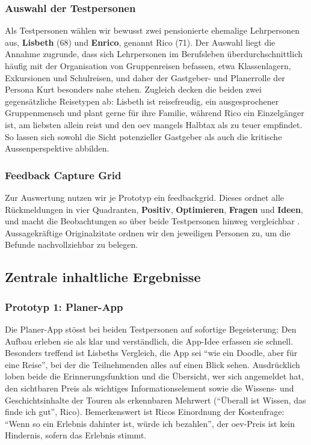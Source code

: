 \subsubsection{Auswahl der Testpersonen}
Als Testpersonen wählen wir bewusst zwei pensionierte ehemalige Lehrpersonen aus, \textbf{Lisbeth} (68) und \textbf{Enrico}, genannt Rico (71). Der Auswahl liegt die Annahme zugrunde, dass sich Lehrpersonen im Berufsleben überdurchschnittlich häufig mit der Organisation von Gruppenreisen befassen, etwa Klassenlagern, Exkursionen und Schulreisen, und daher der Gastgeber- und Planerrolle der Persona Kurt besonders nahe stehen. Zugleich decken die beiden zwei gegensätzliche Reisetypen ab: Lisbeth ist reisefreudig, ein ausgesprochener Gruppenmensch und plant gerne für ihre Familie, während Rico ein Einzelgänger ist, am liebsten allein reist und den \gls{oev} mangels Halbtax als zu teuer empfindet. So lassen sich sowohl die Sicht potenzieller Gastgeber als auch die kritische Aussenperspektive abbilden.

\subsubsection{Feedback Capture Grid}
Zur Auswertung nutzen wir je Prototyp ein \gls{feedbackgrid}. Dieses ordnet alle Rückmeldungen in vier Quadranten, \textbf{Positiv}, \textbf{Optimieren}, \textbf{Fragen} und \textbf{Ideen}, und macht die Beobachtungen so über beide Testpersonen hinweg vergleichbar \parencite{zhaw2026testing}. Aussagekräftige Originalzitate ordnen wir den jeweiligen Personen zu, um die Befunde nachvollziehbar zu belegen.

\newpage
\subsection{Zentrale inhaltliche Ergebnisse}

\subsubsection{Prototyp 1: Planer-App}
Die Planer-App stösst bei beiden Testpersonen auf sofortige Begeisterung: Den Aufbau erleben sie als klar und verständlich, die App-Idee erfassen sie schnell. Besonders treffend ist Lisbeths Vergleich, die App sei \enquote{wie ein Doodle, aber für eine Reise}, bei der die Teilnehmenden alles auf einen Blick sehen. Ausdrücklich loben beide die Erinnerungsfunktion und die Übersicht, wer sich angemeldet hat, den sichtbaren Preis als wichtiges Informationselement sowie die Wissens- und Geschichtsinhalte der Touren als erkennbaren Mehrwert (\enquote{Überall ist Wissen, das finde ich gut}, Rico). Bemerkenswert ist Ricos Einordnung der Kostenfrage: \enquote{Wenn so ein Erlebnis dahinter ist, würde ich bezahlen}, der \gls{oev}-Preis ist kein Hindernis, sofern das Erlebnis stimmt.

